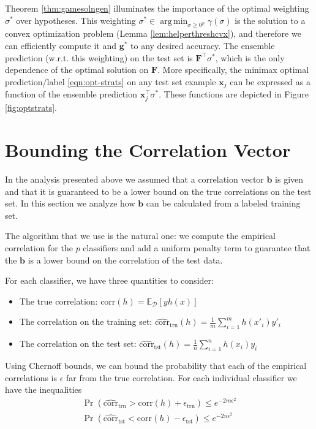 \documentclass{colt2015} %
\newcommand{\corr}{\mbox{corr}}
\newcommand{\vF}{\mathbf{F}}
\newcommand{\vx}{\mathbf{x}}
\newcommand{\vb}{\mathbf{b}}
\newcommand{\vg}{\mathbf{g}}
\DeclareMathOperator*{\argmin}{arg\,min}
\DeclareMathOperator{\Prtxt}{Pr}
\newcommand{\evp}[2]{\mathbb{E}_{#2} \left[#1\right]} %
\newcommand{\pr}[1]{\Prtxt \left(#1\right)}
\newcommand{\cD}{\mathcal{D}}
\begin{document}
Theorem \ref{thm:gamesolngen} illuminates the importance of the optimal weighting $\sigma^*$ over hypotheses. 
This weighting $\sigma^* \in \argmin_{\sigma \geq 0^p} \gamma (\sigma)$ is the solution 
to a convex optimization problem (Lemma \ref{lem:helperthreshcvx}), 
and therefore we can efficiently compute it and $\vg^*$ to any desired accuracy. 
The ensemble prediction (w.r.t. this weighting) on the test set is $\vF^\top \sigma^*$, 
which is the only dependence of the optimal solution on $\vF$.
More specifically, the minimax optimal prediction/label \eqref{eqn:opt-strats} on any test set example $\vx_j$ 
can be expressed as a function of the ensemble prediction $\vx_j^\top \sigma^*$.
These functions are depicted in Figure \ref{fig:optstrats}. 



\section{Bounding the Correlation Vector}
\label{sec:uniform-convergence}

In the analysis presented above we assumed that a correlation vector
$\vb$ is given and that it is guaranteed to be a lower bound  on the
true correlations on the test set. In this section we analyze how
$\vb$ can be calculated from a labeled training set.

The algorithm that we use is the natural one: we compute the empirical
correlation for the $p$ classifiers and add a uniform penalty term to guarantee
that the $\vb$ is a lower bound on the correlation of the test data.

For each classifier, we have three quantities to consider:
\begin{itemize}
\item The true correlation: $\corr(h) = \evp{y h(x)}{\cD}$
\item The correlation on the training set: $\widehat{\corr}_{\mbox{trn}}(h) =
  \frac{1}{m} \sum_{i=1}^m h(x'_i)y'_i$
\item The correlation on the test set: $\widehat{\corr}_{\mbox{tst}}(h) =
  \frac{1}{n} \sum_{i=1}^n h(x_i)y_i$
\end{itemize}
Using Chernoff bounds, we can bound the probability that each of the empirical
correlations is $\epsilon$ far from the true correlation. For each
individual classifier we have the inequalities 
\begin{eqnarray*}
\pr{\widehat{\corr}_{\mbox{trn}} > \corr(h)+\epsilon_{\mbox{trn}}} \leq e^{-2m \epsilon^2} \\
\pr{\widehat{\corr}_{\mbox{tst}} < \corr(h)-\epsilon_{\mbox{tst}}} \leq e^{-2n \epsilon^2} 
\end{eqnarray*}
\end{document}

